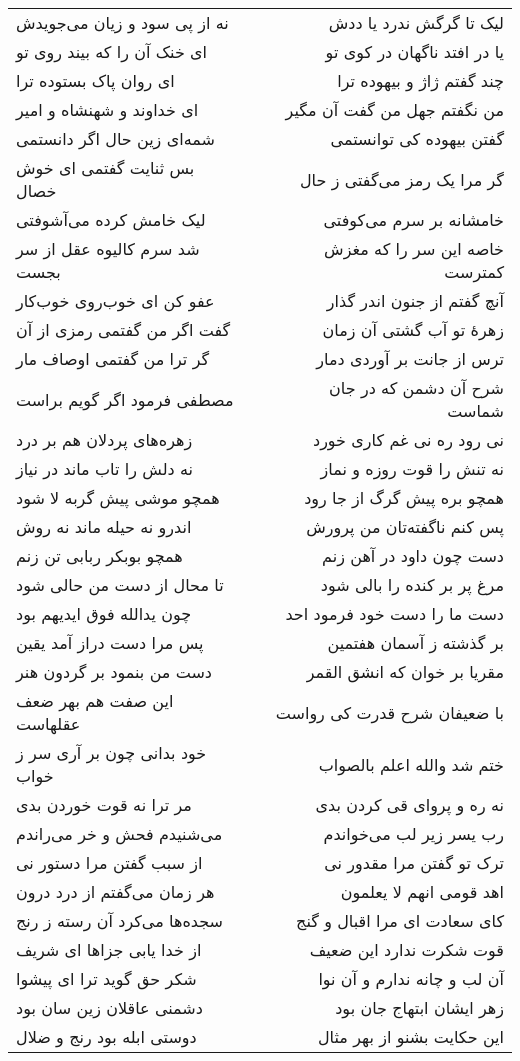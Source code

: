 \begin{center}
\begin{longtable}{l p{0.5cm} r}
نه از پی سود و زیان می‌جویدش
&&
لیک تا گرگش ندرد یا ددش
\\
ای خنک آن را که بیند روی تو
&&
یا در افتد ناگهان در کوی تو
\\
ای روان پاک بستوده ترا
&&
چند گفتم ژاژ و بیهوده ترا
\\
ای خداوند و شهنشاه و امیر
&&
من نگفتم جهل من گفت آن مگیر
\\
شمه‌ای زین حال اگر دانستمی
&&
گفتن بیهوده کی توانستمی
\\
بس ثنایت گفتمی ای خوش خصال
&&
گر مرا یک رمز می‌گفتی ز حال
\\
لیک خامش کرده می‌آشوفتی
&&
خامشانه بر سرم می‌کوفتی
\\
شد سرم کالیوه عقل از سر بجست
&&
خاصه این سر را که مغزش کمترست
\\
عفو کن ای خوب‌روی خوب‌کار
&&
آنچ گفتم از جنون اندر گذار
\\
گفت اگر من گفتمی رمزی از آن
&&
زهرهٔ تو آب گشتی آن زمان
\\
گر ترا من گفتمی اوصاف مار
&&
ترس از جانت بر آوردی دمار
\\
مصطفی فرمود اگر گویم براست
&&
شرح آن دشمن که در جان شماست
\\
زهره‌های پردلان هم بر درد
&&
نی رود ره نی غم کاری خورد
\\
نه دلش را تاب ماند در نیاز
&&
نه تنش را قوت روزه و نماز
\\
همچو موشی پیش گربه لا شود
&&
همچو بره پیش گرگ از جا رود
\\
اندرو نه حیله ماند نه روش
&&
پس کنم ناگفته‌تان من پرورش
\\
همچو بوبکر ربابی تن زنم
&&
دست چون داود در آهن زنم
\\
تا محال از دست من حالی شود
&&
مرغ پر بر کنده را بالی شود
\\
چون یدالله فوق ایدیهم بود
&&
دست ما را دست خود فرمود احد
\\
پس مرا دست دراز آمد یقین
&&
بر گذشته ز آسمان هفتمین
\\
دست من بنمود بر گردون هنر
&&
مقریا بر خوان که انشق القمر
\\
این صفت هم بهر ضعف عقلهاست
&&
با ضعیفان شرح قدرت کی رواست
\\
خود بدانی چون بر آری سر ز خواب
&&
ختم شد والله اعلم بالصواب
\\
مر ترا نه قوت خوردن بدی
&&
نه ره و پروای قی کردن بدی
\\
می‌شنیدم فحش و خر می‌راندم
&&
رب یسر زیر لب می‌خواندم
\\
از سبب گفتن مرا دستور نی
&&
ترک تو گفتن مرا مقدور نی
\\
هر زمان می‌گفتم از درد درون
&&
اهد قومی انهم لا یعلمون
\\
سجده‌ها می‌کرد آن رسته ز رنج
&&
کای سعادت ای مرا اقبال و گنج
\\
از خدا یابی جزاها ای شریف
&&
قوت شکرت ندارد این ضعیف
\\
شکر حق گوید ترا ای پیشوا
&&
آن لب و چانه ندارم و آن نوا
\\
دشمنی عاقلان زین سان بود
&&
زهر ایشان ابتهاج جان بود
\\
دوستی ابله بود رنج و ضلال
&&
این حکایت بشنو از بهر مثال
\\
\end{longtable}
\end{center}
